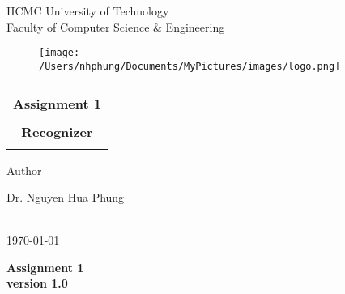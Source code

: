 \documentclass[11pt]{article}
\begin{document}
\begin{titlepage}
\begin{center}
HCMC University of Technology\\
Faculty of Computer Science \& Engineering\\
\end{center}

\vspace{1cm}

\begin{figure}[h!]
\begin{center}
\texttt{[image: /Users/nhphung/Documents/MyPictures/images/logo.png]}
\end{center}
\end{figure}

\vspace{1cm}

\begin{center}
\begin{tabular}{c}
\hline
\\
\textbf{{\Huge Assignment 1}}\\
\\
\textbf{{\Large Recognizer}}\\
\\
\hline
\end{tabular}
\end{center}

\vspace{5cm}

\begin{minipage}[t]{0.60\linewidth}
Author
\end{minipage}
\begin{minipage}[t]{0.40\linewidth}
Dr. Nguyen Hua Phung\\\\
\end{minipage}

\begin{center}
\today
\end{center}

\end{titlepage}

\newpage

\tableofcontents %

\newpage



\begin{center}
{\Large \bf Assignment 1 \\\vspace{5mm}version 1.0}
\end{center}
\end{document}
